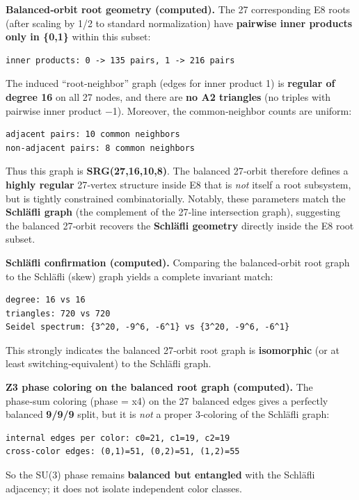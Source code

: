 \documentclass[11pt]{article}
\begin{document}
\textbf{Balanced‑orbit root geometry (computed).} The 27 corresponding
E8 roots (after scaling by 1/2 to standard normalization) have
\textbf{pairwise inner products only in \{0,1\}} within this subset:

\begin{verbatim}
inner products: 0 -> 135 pairs, 1 -> 216 pairs
\end{verbatim}

The induced ``root‑neighbor'' graph (edges for inner product 1) is
\textbf{regular of degree 16} on all 27 nodes, and there are \textbf{no
A2 triangles} (no triples with pairwise inner product −1). Moreover, the
common‑neighbor counts are uniform:

\begin{verbatim}
adjacent pairs: 10 common neighbors
non‑adjacent pairs: 8 common neighbors
\end{verbatim}

Thus this graph is \textbf{SRG(27,16,10,8)}. The balanced 27‑orbit
therefore defines a \textbf{highly regular} 27‑vertex structure inside
E8 that is \emph{not} itself a root subsystem, but is tightly
constrained combinatorially. Notably, these parameters match the
\textbf{Schläfli graph} (the complement of the 27‑line intersection
graph), suggesting the balanced 27‑orbit recovers the \textbf{Schläfli
geometry} directly inside the E8 root subset.

\textbf{Schläfli confirmation (computed).} Comparing the balanced‑orbit
root graph to the Schläfli (skew) graph yields a complete invariant
match:

\begin{verbatim}
degree: 16 vs 16
triangles: 720 vs 720
Seidel spectrum: {3^20, -9^6, -6^1} vs {3^20, -9^6, -6^1}
\end{verbatim}

This strongly indicates the balanced 27‑orbit root graph is
\textbf{isomorphic} (or at least switching‑equivalent) to the Schläfli
graph.

\textbf{Z3 phase coloring on the balanced root graph (computed).} The
phase‑sum coloring (phase = x4) on the 27 balanced edges gives a
perfectly balanced \textbf{9/9/9} split, but it is \emph{not} a proper
3‑coloring of the Schläfli graph:

\begin{verbatim}
internal edges per color: c0=21, c1=19, c2=19
cross‑color edges: (0,1)=51, (0,2)=51, (1,2)=55
\end{verbatim}

So the SU(3) phase remains \textbf{balanced but entangled} with the
Schläfli adjacency; it does not isolate independent color classes.
\end{document}
